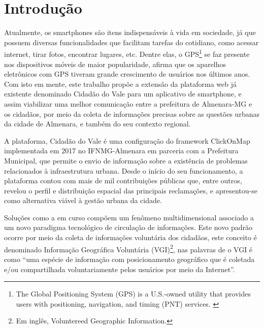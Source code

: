 \chapter*[INTRODUÇÃO]{Introdução}
Atualmente, os smartphones são itens indispensáveis à vida em sociedade, já que possuem diversas funcionalidades que facilitam tarefas do cotidiano, como acessar internet, tirar fotos, encontrar lugares, etc. Dentre elas, o GPS\footnote{The Global Positioning System (GPS) is a U.S.-owned utility that provides users with positioning, navigation, and timing (PNT) services. \cite{u.s._government_gps.gov:_nodate}} se faz presente nos dispositivos móveis de maior popularidade,  afirma que os aparelhos eletrônicos com GPS tiveram grande crescimento de usuários nos últimos anos. Com isto em mente, este trabalho propõe a extensão da plataforma web já existente denominado Cidadão do Vale para um aplicativo de smartphone, e assim viabilizar uma melhor comunicação entre a prefeitura de Almenara-MG e os cidadãos, por meio da coleta de informações precisas sobre as questões urbanas da cidade de Almenara, e também do seu contexto regional.

A plataforma, Cidadão do Vale é uma configuração do framework ClickOnMap implementada em 2017 no IFNMG-Almenara em parceria com a Prefeitura Municipal, que permite o envio de informação sobre a existência de problemas relacionados à infraestrutura urbana. Desde o início do seu funcionamento, a plataforma contou com mais de mil contribuições públicas que, entre outros, revelou o perfil e distribuição espacial das principais reclamações, e apresentou-se como alternativa viável à gestão urbana da cidade.

Soluções como a em curso compõem um fenômeno multidimensional associado a um novo paradigma tecnológico de circulação de informações. Este novo padrão ocorre por meio da coleta de informações voluntária dos cidadãos, este conceito é denominado Informação Geográfica Voluntária (VGI)\footnote{Em inglês, Voluntereed Geographic Information.}, nas palavras de  o VGI é como “uma espécie de informação com posicionamento geográfico que é coletada e/ou compartilhada voluntariamente pelos usuários por meio da Internet”.

